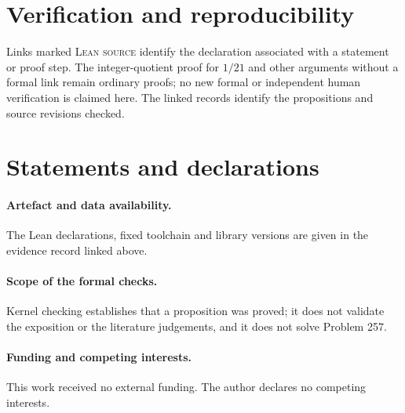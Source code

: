 \documentclass[11pt]{article}
\theoremstyle{plain}
\theoremstyle{definition}
\theoremstyle{remark}
\begin{document}
\endgroup

\section*{Verification and reproducibility}
\evidenceparagraph{\evidencerecordurl}
Links marked \textsc{Lean source} identify the declaration associated
with a statement or proof step. The integer-quotient proof for $1/21$
and other arguments without a formal link remain ordinary proofs; no
new formal or independent human verification is claimed here. The
linked records identify the propositions and source revisions checked.

\section*{Statements and declarations}

\paragraph{Artefact and data availability.} The Lean declarations, fixed
toolchain and library versions are given in the evidence record linked above.

\paragraph{Scope of the formal checks.} Kernel checking establishes that a proposition
was proved; it does not validate the exposition or the literature judgements, and it
does not solve Problem 257.

\paragraph{Funding and competing interests.} This work received no external
funding. The author declares no competing interests.
\end{document}
